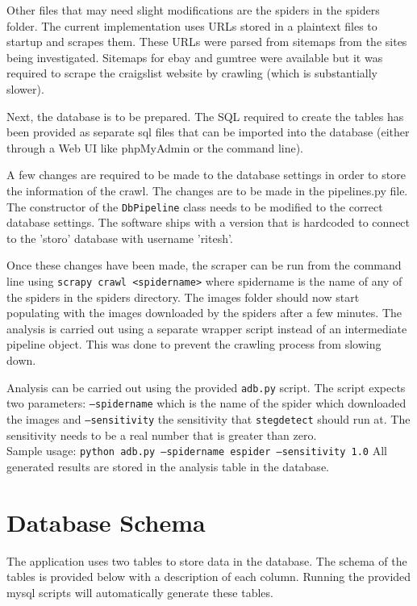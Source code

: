 \singlespacing

Other files that may need slight modifications are the spiders in the spiders folder. The current implementation uses URLs stored in a plaintext files to startup and scrapes them. These URLs were parsed from sitemaps from the sites being investigated. Sitemaps for ebay and gumtree were available but it was required to scrape the craigslist website by crawling (which is substantially slower). 

Next, the database is to be prepared. The SQL required to create the tables has been provided as separate sql files that can be imported into the database (either through a Web UI like phpMyAdmin or the command line). 

A few changes are required to be made to the database settings in order to store the information of the crawl. The changes are to be made in the pipelines.py file. The constructor of the \texttt{DbPipeline} class needs to be modified to the correct database settings. The software ships with a version that is hardcoded to connect to the 'storo' database with username 'ritesh'.

Once these changes have been made, the scraper can be run from the command line using \texttt{scrapy crawl <spidername>} where spidername is the name of any of the spiders in the spiders directory. The images folder should now start populating with the images downloaded by the spiders after a few minutes.  The analysis is carried out using a separate wrapper script instead of an intermediate pipeline object. This was done to prevent the crawling process from slowing down.

Analysis can be carried out using the provided \texttt{adb.py} script. The script expects two parameters: \texttt{--spidername} which is the name of the spider which downloaded the images and \texttt{--sensitivity} the sensitivity that \texttt{stegdetect} should run at. The sensitivity needs to be a real number that is greater than zero.
\\Sample usage: \texttt{python adb.py --spidername espider --sensitivity 1.0}
All generated results are stored in the analysis table in the database.   

\chapter{Database Schema}
The application uses two tables to store data in the database. The schema of the tables is provided below with a description of each column. Running the provided mysql scripts will automatically generate these tables.
